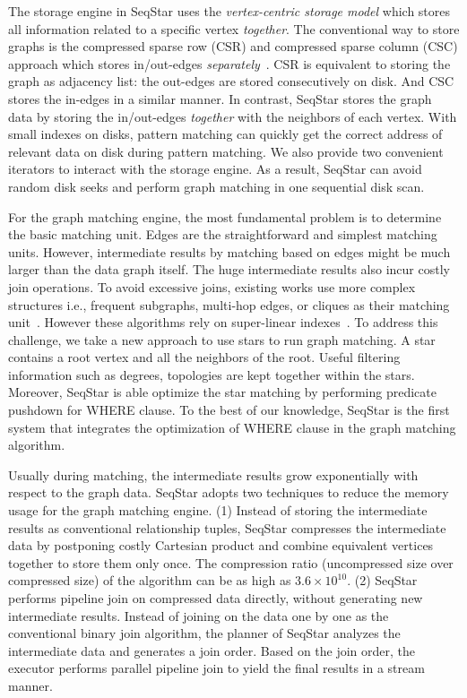 The storage engine in SeqStar uses the \emph{vertex-centric storage model} which stores all information related to a specific vertex \emph{together}.
The conventional way to store graphs is the compressed sparse row (CSR) and compressed sparse column (CSC) approach which stores in/out-edges \emph{separately}~\cite{DBLP:conf/sc/PearceGA10,DBLP:conf/osdi/KyrolaBG12}.
CSR is equivalent to storing the graph as adjacency list: the out-edges are stored consecutively on disk.
And CSC stores the in-edges in a similar manner.
In contrast, SeqStar stores the graph data by storing the in/out-edges \emph{together} with the neighbors of each vertex.
With small indexes on disks, pattern matching can quickly get the correct address of relevant data on disk during pattern matching.
We also provide two convenient iterators to interact with the storage engine.
As a result, SeqStar can avoid random disk seeks and perform graph matching in one sequential disk scan.

For the graph matching engine, the most fundamental problem is to determine the basic matching unit.
Edges are the straightforward and simplest matching units. However, intermediate results by matching based on edges might be much larger than the data graph itself. The huge intermediate results also incur costly join operations.
To avoid excessive joins, existing works use more complex structures i.e.,
frequent subgraphs, multi-hop edges, or cliques as their matching unit~\cite{DBLP:conf/sigmod/HeS08,DBLP:conf/edbt/ZhangLY09,DBLP:journals/pvldb/QiaoZC17}.
However these algorithms rely on super-linear indexes~\cite{DBLP:journals/pvldb/SunWWSL12}.
To address this challenge, we take a new approach to use stars to run graph matching.
A star contains a root vertex and all the neighbors of the root.
Useful filtering information such as degrees, topologies are kept together within the stars.
Moreover, SeqStar is able optimize the star matching by performing predicate pushdown for WHERE clause.
To the best of our knowledge, SeqStar is the first system that integrates the optimization of WHERE clause in the graph matching algorithm.

Usually during matching, the intermediate results grow exponentially with respect to the graph data.
SeqStar adopts two techniques to reduce the memory usage for the graph matching engine.
(1) Instead of storing the intermediate results as conventional relationship tuples,
SeqStar compresses the intermediate data by postponing costly Cartesian product and combine equivalent vertices together to store them only once.
The compression ratio (uncompressed size over compressed size) of the algorithm can be as high as $3.6 \times 10^{10}$.
(2) SeqStar performs pipeline join on compressed data directly, without generating new intermediate results.
Instead of joining on the data one by one as the conventional binary join algorithm,
the planner of SeqStar analyzes the intermediate data and generates a join order.
Based on the join order, the executor performs parallel pipeline join to yield the final results in a stream manner.

